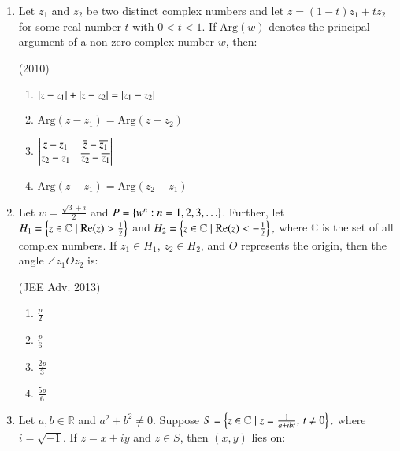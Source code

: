 \documentclass[journal,12pt,twocolumn]{IEEEtran}
\theoremstyle{remark}
\begin{document}
\begin{enumerate}
    \begin{enumerate}[label=\alph*.]
    \item x=3,y=4
    \item x=1,y=3
    \item x=0,y=4
    \item x=0,y=0
    \end{enumerate}
    

    \item Let $ z_1 $ and $ z_2 $ be two distinct complex numbers and let $ z = (1 - t) z_1 + t z_2 $ for some real number $ t $ with $ 0 < t < 1 $. If $ \text{Arg}(w) $ denotes the principal argument of a non-zero complex number $ w $, then:

\hfill (2010)

\begin{enumerate}[label=\alph*.]
    \item $ \left\vert z - z_1\right\vert + \left\vert z - z_2\right\vert = \left\vert z_1 - z_2\right\vert $
    \item $ \text{Arg}(z - z_1) = \text{Arg}(z - z_2) $
    \item $
    \begin{vmatrix}
    z - z_1 & \overline{z} - \overline{z_1} \\
    z_2 - z_1 & \overline{z_2} - \overline{z_1}
    \end{vmatrix}
    $
    \item $\text{Arg}(z - z_1) = \text{Arg}(z_2 - z_1)$
\end{enumerate}

   \item Let $ w = \frac{\sqrt{3} + i}{2} $ and $ P = \left\{w^n : n = 1, 2, 3, \ldots \right\} $. Further, let 
$
H_1 = \left\{ z \in \mathbb{C} \mid \text{Re}(z) > \frac{1}{2} \right\}
$
and
$
H_2 = \left\{ z \in \mathbb{C} \mid \text{Re}(z) < -\frac{1}{2} \right\},
$
where $ \mathbb{C} $ is the set of all complex numbers. If $ z_1 \in H_1 $, $ z_2 \in H_2 $, and $ O $ represents the origin, then the angle $ \angle z_1Oz_2 $ is:

\hfill (JEE Adv. 2013)

\begin{multicols}{4}
    \begin{enumerate}[label=\alph*.]
    \item $ \frac{p}{2} $
    \item $ \frac{p}{6} $
    \item $ \frac{2p}{3} $
    \item $ \frac{5p}{6} $
    \end{enumerate}
\end{multicols}

    \item Let $ a, b \in \mathbb{R} $ and $ a^2 + b^2 \ne 0 $. Suppose
    $
    S = \left\{ z \in \mathbb{C} \mid z = \frac{1}{a + ibt}, \, t \ne 0 \right\},
    $
    where $ i = \sqrt{-1} $. If $ z = x + iy $ and $ z \in S $, then $(x, y)$ lies on:


\end{enumerate}
\end{document}
